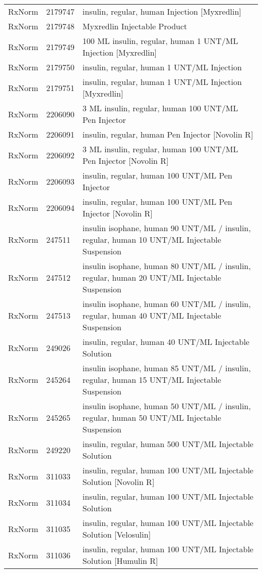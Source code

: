 \begin{longtable}{p{}p{}p{}}
  RxNorm & 2179747 & insulin, regular, human Injection [Myxredlin] \\ 
  RxNorm & 2179748 & Myxredlin Injectable Product \\ 
  RxNorm & 2179749 & 100 ML insulin, regular, human 1 UNT/ML Injection [Myxredlin] \\ 
  RxNorm & 2179750 & insulin, regular, human 1 UNT/ML Injection \\ 
  RxNorm & 2179751 & insulin, regular, human 1 UNT/ML Injection [Myxredlin] \\ 
  RxNorm & 2206090 & 3 ML insulin, regular, human 100 UNT/ML Pen Injector \\ 
  RxNorm & 2206091 & insulin, regular, human Pen Injector [Novolin R] \\ 
  RxNorm & 2206092 & 3 ML insulin, regular, human 100 UNT/ML Pen Injector [Novolin R] \\ 
  RxNorm & 2206093 & insulin, regular, human 100 UNT/ML Pen Injector \\ 
  RxNorm & 2206094 & insulin, regular, human 100 UNT/ML Pen Injector [Novolin R] \\ 
  RxNorm & 247511 & insulin isophane, human 90 UNT/ML / insulin, regular, human 10 UNT/ML Injectable Suspension \\ 
  RxNorm & 247512 & insulin isophane, human 80 UNT/ML / insulin, regular, human 20 UNT/ML Injectable Suspension \\ 
  RxNorm & 247513 & insulin isophane, human 60 UNT/ML / insulin, regular, human 40 UNT/ML Injectable Suspension \\ 
  RxNorm & 249026 & insulin, regular, human 40 UNT/ML Injectable Solution \\ 
  RxNorm & 245264 & insulin isophane, human 85 UNT/ML / insulin, regular, human 15 UNT/ML Injectable Suspension \\ 
  RxNorm & 245265 & insulin isophane, human 50 UNT/ML / insulin, regular, human 50 UNT/ML Injectable Suspension \\ 
  RxNorm & 249220 & insulin, regular, human 500 UNT/ML Injectable Solution \\ 
  RxNorm & 311033 & insulin, regular, human 100 UNT/ML Injectable Solution [Novolin R] \\ 
  RxNorm & 311034 & insulin, regular, human 100 UNT/ML Injectable Solution \\ 
  RxNorm & 311035 & insulin, regular, human 100 UNT/ML Injectable Solution [Velosulin] \\ 
  RxNorm & 311036 & insulin, regular, human 100 UNT/ML Injectable Solution [Humulin R] \\ 

\end{longtable}
